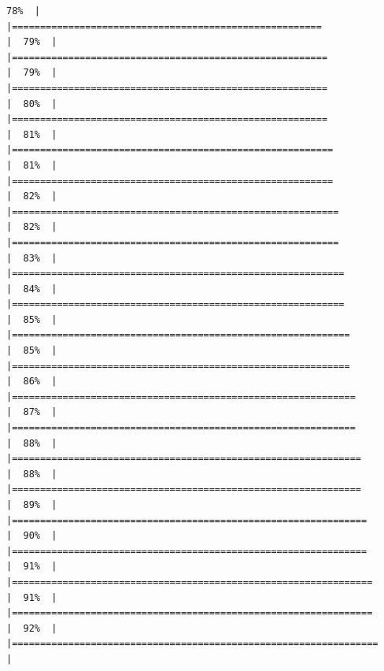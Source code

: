 \documentclass[
  english,
  man,a4paper,mask,floatsintext]{apa6}
\begin{document}
\begin{verbatim}
78%  |                                                                              |=======================================================               |  79%  |                                                                              |========================================================              |  79%  |                                                                              |========================================================              |  80%  |                                                                              |========================================================              |  81%  |                                                                              |=========================================================             |  81%  |                                                                              |=========================================================             |  82%  |                                                                              |==========================================================            |  82%  |                                                                              |==========================================================            |  83%  |                                                                              |===========================================================           |  84%  |                                                                              |===========================================================           |  85%  |                                                                              |============================================================          |  85%  |                                                                              |============================================================          |  86%  |                                                                              |=============================================================         |  87%  |                                                                              |=============================================================         |  88%  |                                                                              |==============================================================        |  88%  |                                                                              |==============================================================        |  89%  |                                                                              |===============================================================       |  90%  |                                                                              |===============================================================       |  91%  |                                                                              |================================================================      |  91%  |                                                                              |================================================================      |  92%  |                                                                              |=================================================================     |  
\end{verbatim}
\end{document}
